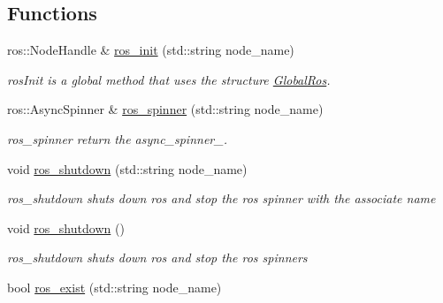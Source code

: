 \subsection*{Functions}
\begin{DoxyCompactItemize}
\item 
ros\+::\+Node\+Handle \& \hyperlink{namespacedynamic__graph_ab01ece41a91a029cf335e28548cdfc06}{ros\+\_\+init} (std\+::string node\+\_\+name)
\begin{DoxyCompactList}\small\item\em ros\+Init is a global method that uses the structure \hyperlink{structdynamic__graph_1_1GlobalRos}{Global\+Ros}. \end{DoxyCompactList}\item 
ros\+::\+Async\+Spinner \& \hyperlink{namespacedynamic__graph_a0ab97e95b56e05d30fd3112f8dfcf8eb}{ros\+\_\+spinner} (std\+::string node\+\_\+name)
\begin{DoxyCompactList}\small\item\em ros\+\_\+spinner return the async\+\_\+spinner\+\_\+. \end{DoxyCompactList}\item 
void \hyperlink{namespacedynamic__graph_a0a7d6cd6c123bd1852af188fc06ce4f7}{ros\+\_\+shutdown} (std\+::string node\+\_\+name)\hypertarget{namespacedynamic__graph_a0a7d6cd6c123bd1852af188fc06ce4f7}{}\label{namespacedynamic__graph_a0a7d6cd6c123bd1852af188fc06ce4f7}

\begin{DoxyCompactList}\small\item\em ros\+\_\+shutdown shuts down ros and stop the ros spinner with the associate name \end{DoxyCompactList}\item 
void \hyperlink{namespacedynamic__graph_a7d2045abc7e02fe4ee746c5cbb937b04}{ros\+\_\+shutdown} ()\hypertarget{namespacedynamic__graph_a7d2045abc7e02fe4ee746c5cbb937b04}{}\label{namespacedynamic__graph_a7d2045abc7e02fe4ee746c5cbb937b04}

\begin{DoxyCompactList}\small\item\em ros\+\_\+shutdown shuts down ros and stop the ros spinners \end{DoxyCompactList}\item 
bool \hyperlink{namespacedynamic__graph_ab000cd6e1e6ed365a5a3e1adddf89dff}{ros\+\_\+exist} (std\+::string node\+\_\+name)\hypertarget{namespacedynamic__graph_ab000cd6e1e6ed365a5a3e1adddf89dff}{}\label{namespacedynamic__graph_ab000cd6e1e6ed365a5a3e1adddf89dff}


\end{DoxyCompactItemize}
